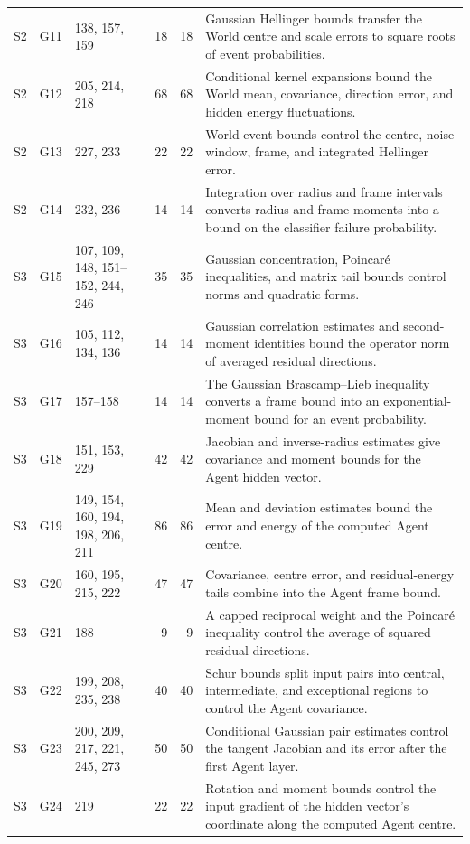 \begin{longtable}{@{}l l p{} r r p{}@{}}
S2 & G11 & \raggedright 138, 157, 159 & 18 & 18 & \raggedright Gaussian Hellinger bounds transfer the World centre and scale errors to square roots of event probabilities. \tabularnewline
S2 & G12 & \raggedright 205, 214, 218 & 68 & 68 & \raggedright Conditional kernel expansions bound the World mean, covariance, direction error, and hidden energy fluctuations. \tabularnewline
S2 & G13 & \raggedright 227, 233 & 22 & 22 & \raggedright World event bounds control the centre, noise window, frame, and integrated Hellinger error. \tabularnewline
S2 & G14 & \raggedright 232, 236 & 14 & 14 & \raggedright Integration over radius and frame intervals converts radius and frame moments into a bound on the classifier failure probability. \tabularnewline
S3 & G15 & \raggedright 107, 109, 148, 151--152, 244, 246 & 35 & 35 & \raggedright Gaussian concentration, Poincaré inequalities, and matrix tail bounds control norms and quadratic forms. \tabularnewline
S3 & G16 & \raggedright 105, 112, 134, 136 & 14 & 14 & \raggedright Gaussian correlation estimates and second-moment identities bound the operator norm of averaged residual directions. \tabularnewline
S3 & G17 & \raggedright 157--158 & 14 & 14 & \raggedright The Gaussian Brascamp--Lieb inequality converts a frame bound into an exponential-moment bound for an event probability. \tabularnewline
S3 & G18 & \raggedright 151, 153, 229 & 42 & 42 & \raggedright Jacobian and inverse-radius estimates give covariance and moment bounds for the Agent hidden vector. \tabularnewline
S3 & G19 & \raggedright 149, 154, 160, 194, 198, 206, 211 & 86 & 86 & \raggedright Mean and deviation estimates bound the error and energy of the computed Agent centre. \tabularnewline
S3 & G20 & \raggedright 160, 195, 215, 222 & 47 & 47 & \raggedright Covariance, centre error, and residual-energy tails combine into the Agent frame bound. \tabularnewline
S3 & G21 & \raggedright 188 & 9 & 9 & \raggedright A capped reciprocal weight and the Poincaré inequality control the average of squared residual directions. \tabularnewline
S3 & G22 & \raggedright 199, 208, 235, 238 & 40 & 40 & \raggedright Schur bounds split input pairs into central, intermediate, and exceptional regions to control the Agent covariance. \tabularnewline
S3 & G23 & \raggedright 200, 209, 217, 221, 245, 273 & 50 & 50 & \raggedright Conditional Gaussian pair estimates control the tangent Jacobian and its error after the first Agent layer. \tabularnewline
S3 & G24 & \raggedright 219 & 22 & 22 & \raggedright Rotation and moment bounds control the input gradient of the hidden vector's coordinate along the computed Agent centre. \tabularnewline

\end{longtable}
